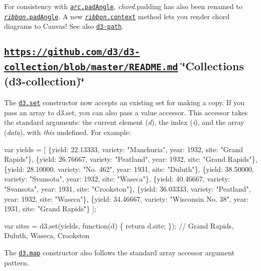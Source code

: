 For consistency with \href{https://github.com/d3/d3-shape/blob/master/README.md#arc_padAngle}{\tt {\itshape arc}.pad\+Angle}, {\itshape chord}.padding has also been renamed to \href{https://github.com/d3/d3-chord/blob/master/README.md#ribbon_padAngle}{\tt {\itshape ribbon}.pad\+Angle}. A new \href{https://github.com/d3/d3-chord/blob/master/README.md#ribbon_context}{\tt {\itshape ribbon}.context} method lets you render chord diagrams to Canvas! See also \href{#paths-d3-path}{\tt d3-\/path}.

\subsection*{\href{https://github.com/d3/d3-collection/blob/master/README.md}{\tt https\+://github.\+com/d3/d3-\/collection/blob/master/\+R\+E\+A\+D\+M\+E.\+md} \char`\"{}\+Collections (d3-\/collection)\char`\"{}}

The \href{https://github.com/d3/d3-collection/blob/master/README.md#set}{\tt d3.\+set} constructor now accepts an existing set for making a copy. If you pass an array to d3.\+set, you can also pass a value accessor. This accessor takes the standard arguments\+: the current element ({\itshape d}), the index ({\itshape i}), and the array ({\itshape data}), with {\itshape this} undefined. For example\+:


\begin{DoxyCode}
var yields = [
  \{yield: 22.13333, variety: "Manchuria",        year: 1932, site: "Grand Rapids"\},
  \{yield: 26.76667, variety: "Peatland",         year: 1932, site: "Grand Rapids"\},
  \{yield: 28.10000, variety: "No. 462",          year: 1931, site: "Duluth"\},
  \{yield: 38.50000, variety: "Svansota",         year: 1932, site: "Waseca"\},
  \{yield: 40.46667, variety: "Svansota",         year: 1931, site: "Crookston"\},
  \{yield: 36.03333, variety: "Peatland",         year: 1932, site: "Waseca"\},
  \{yield: 34.46667, variety: "Wisconsin No. 38", year: 1931, site: "Grand Rapids"\}
];

var sites = d3.set(yields, function(d) \{ return d.site; \}); // Grand Rapids, Duluth, Waseca, Crookston
\end{DoxyCode}


The \href{https://github.com/d3/d3-collection/blob/master/README.md#map}{\tt d3.\+map} constructor also follows the standard array accessor argument pattern.

